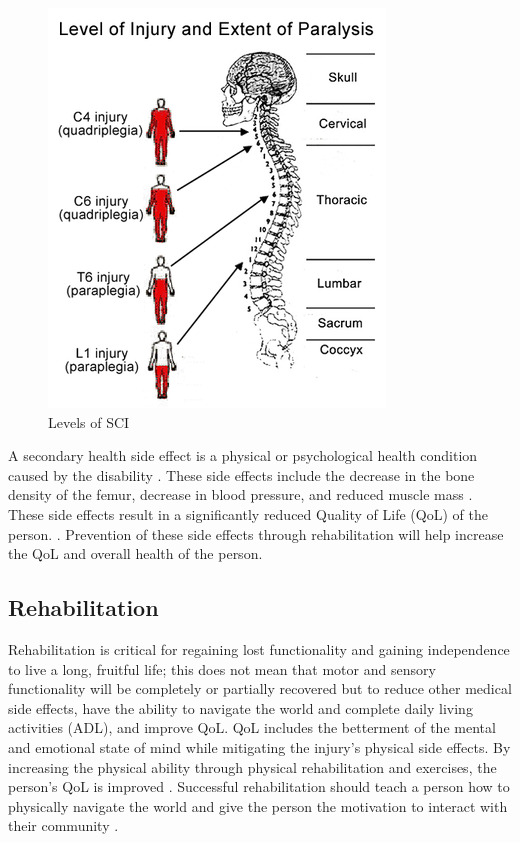  

\begin{figure}
    \centering
    \includegraphics[scale=0.6]{images/background/SCI.png}
    \caption[Levels of SCI]{Levels of SCI \cite{sadaka2012bradycardia}}
    \label{fig:SCILevels}
\end{figure}

A secondary health side effect is a physical or psychological health condition caused by the disability \cite{jensen2012secondary}.  These side effects include the decrease in the bone density of the femur, decrease in blood pressure, and reduced muscle mass \cite{haisma2007complications} \cite{hitzig2010understanding}. These side effects result in a significantly reduced Quality of Life (QoL) of the person.  	\cite{craven2012impact}. Prevention of these side effects through rehabilitation will help increase the QoL and overall health of the person.  








\subsection{Rehabilitation}
\label{sec:rehab}

 Rehabilitation is critical for regaining lost functionality and gaining independence to live a long, fruitful life; this does not mean that motor and sensory functionality will be completely or partially recovered but to reduce other medical side effects, have the ability to navigate the world and complete daily living activities (ADL), and improve QoL. QoL includes the betterment of the mental and emotional state of mind while mitigating the injury's physical side effects. By increasing the physical ability through physical rehabilitation and exercises, the person's QoL is improved \cite{noreau1995spinal}. Successful rehabilitation should teach a person how to physically navigate the world and give the person the motivation to interact with their community \cite{hammell2013spinal}.
 
